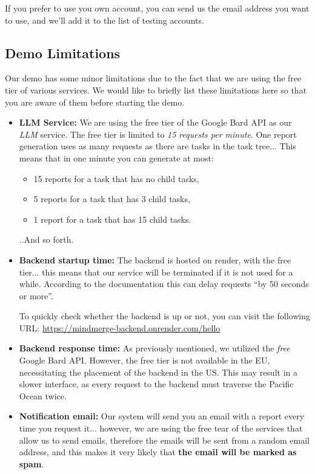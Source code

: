 \documentclass{article}
\begin{document}
If you prefer to use you own account, you can send us the email address you want to use, and we'll add it to the list of testing accounts.

\subsection{Demo Limitations}

Our demo has some minor limitations due to the fact that we are using the free tier of various services. We would like to briefly list these limitations here so that you are aware of them before starting the demo.

\begin{itemize}
  \item \textbf{LLM Service:} We are using the free tier of the Google Bard API as our \textit{LLM} service. The free tier is limited to \textit{15 requests per minute}.
        One report generation uses as many requests as there are tasks in the task tree... This means that in one minute you can generate at most:
        \begin{itemize}
          \item 15 reports for a task that has no child tasks,
          \item 5 reports for a task that has 3 child tasks,
          \item 1 report for a task that has 15 child tasks.
        \end{itemize}
        ..And so forth.
  \item \textbf{Backend startup time:} The backend is hosted on render, with the free tier... this means that our service will be 
        terminated if it is not used for a while. According to the documentation this can delay requests ``by 50 seconds or more''.

        To quickly check whether the backend is up or not, you can visit the following URL: \url{https://mindmerge-backend.onrender.com/hello}
  \item \textbf{Backend response time:} As previously mentioned, we utilized the \textit{free} Google Bard API. However, the free tier is not available in the EU, necessitating the placement of the backend in the US. This may result in a slower interface, as every request to the backend must traverse the Pacific Ocean twice.

  \item \textbf{Notification email:} Our system will send you an email with a report every time you request it... however, we are using the free tear of the 
  services that allow us to send emails, therefore the emails will be sent from a random email address, and this makes it very likely that \textbf{the email will be marked as spam}.
\end{itemize}
\end{document}
